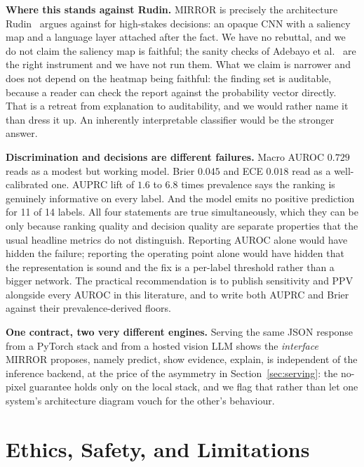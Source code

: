 \documentclass[conference]{IEEEtran}
\newcommand{\rih}[1]{\textbf{#1}\enspace\ignorespaces}
\begin{document}
\rih{Where this stands against Rudin.} MIRROR is precisely the architecture
Rudin~\cite{rudin2019stop} argues against for high-stakes decisions: an opaque CNN
with a saliency map and a language layer attached after the fact. We have no
rebuttal, and we do not claim the saliency map is faithful; the sanity checks of
Adebayo et al.~\cite{adebayo2018sanity} are the right instrument and we have not run
them. What we claim is narrower and does not depend on the heatmap being faithful:
the finding set is auditable, because a reader can check the report against the
probability vector directly. That is a retreat from explanation to auditability, and
we would rather name it than dress it up. An inherently interpretable classifier
would be the stronger answer.

\rih{Discrimination and decisions are different failures.} Macro AUROC $0.729$ reads
as a modest but working model. Brier $0.045$ and ECE $0.018$ read as a
well-calibrated one. AUPRC lift of $1.6$ to $6.8$ times prevalence says the ranking
is genuinely informative on every label. And the model emits no positive prediction
for 11 of 14 labels. All four statements are true simultaneously, which they can be
only because ranking quality and decision quality are separate properties that the
usual headline metrics do not distinguish. Reporting AUROC alone would have hidden
the failure; reporting the operating point alone would have hidden that the
representation is sound and the fix is a per-label threshold rather than a bigger
network. The practical recommendation is to publish sensitivity and PPV alongside
every AUROC in this literature, and to write both AUPRC and Brier against their
prevalence-derived floors.

\rih{One contract, two very different engines.} Serving the same JSON response from
a PyTorch stack and from a hosted vision LLM shows the \emph{interface} MIRROR
proposes, namely predict, show evidence, explain, is independent of the inference
backend, at the price of the asymmetry in Section~\ref{sec:serving}: the no-pixel
guarantee holds only on the local stack, and we flag that rather than let one
system's architecture diagram vouch for the other's behaviour.

\section{Ethics, Safety, and Limitations}
\label{sec:ethics}
\end{document}
